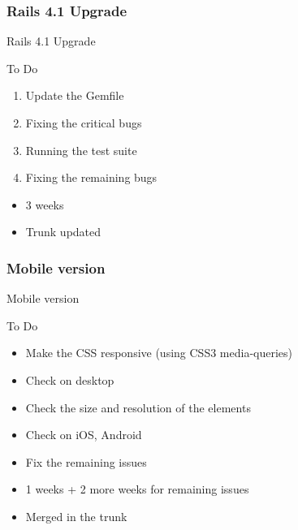 \documentclass[10pt,a4paper]{beamer}
\begin{document}
\subsubsection{Rails 4.1 Upgrade}

\begin{frame}{Rails 4.1 Upgrade}
  \begin{block}{To Do}
    \begin{enumerate}
      \item Update the Gemfile
      \item Fixing the critical bugs
      \item Running the test suite
      \item Fixing the remaining bugs
    \end{enumerate}
  \end{block}
  
  \begin{block}{}
    \begin{itemize}
      \item 3 weeks
      \item Trunk updated
    \end{itemize}
  \end{block}
\end{frame}

\subsubsection{Mobile version}

\begin{frame}{Mobile version}
  \begin{block}{To Do}
    \begin{itemize}
      \item Make the CSS responsive (using CSS3 media-queries)
      \item Check on desktop 
      \item Check the size and resolution of the elements
      \item Check on iOS, Android
      \item Fix the remaining issues 
    \end{itemize}
  \end{block}
  
  \begin{block}{}
    \begin{itemize}
      \item 1 weeks + 2 more weeks for remaining issues
      \item Merged in the trunk
    \end{itemize}
  \end{block}
\end{frame}
\end{document}

